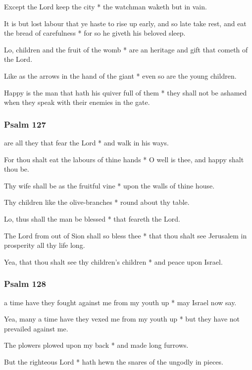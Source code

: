 Except the Lord keep the city * the watchman waketh but in vain.

It is but lost labour that ye haste to rise up early, and so late take rest, and eat the bread of carefulness * for so he giveth his beloved sleep.

Lo, children and the fruit of the womb * are an heritage and gift that cometh of the Lord.

Like as the arrows in the hand of the giant * even so are the young children.

Happy is the man that hath his quiver full of them * they shall not be ashamed when they speak with their enemies in the gate.

\subsubsection{Psalm 127}


 are all they that fear the Lord * and walk in his ways.

For thou shalt eat the labours of thine hands * O well is thee, and happy shalt thou be.

Thy wife shall be as the fruitful vine * upon the walls of thine house.

Thy children like the olive-branches * round about thy table.

Lo, thus shall the man be blessed * that feareth the Lord.

The Lord from out of Sion shall so bless thee * that thou shalt see Jerusalem in prosperity all thy life long.

Yea, that thou shalt see thy children's children * and peace upon Israel.

\subsubsection{Psalm 128}


 a time have they fought against me from my youth up * may Israel now say.

Yea, many a time have they vexed me from my youth up * but they have not prevailed against me.

The plowers plowed upon my back * and made long furrows.

But the righteous Lord * hath hewn the snares of the ungodly in pieces.

